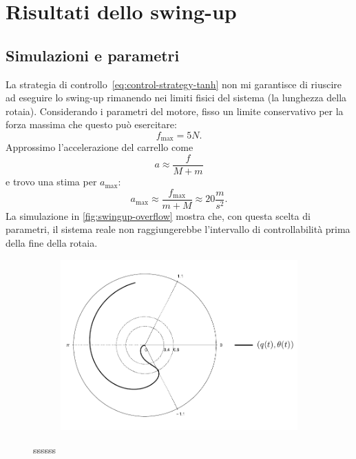 \section{Risultati dello swing-up}

\subsection{Simulazioni e parametri}
La strategia di controllo~\eqref{eq:control-strategy-tanh} non
mi garantisce di riuscire ad eseguire lo swing-up rimanendo nei
limiti fisici del sistema (la lunghezza della rotaia).
Considerando i parametri del motore, fisso un limite conservativo
per la forza massima che questo può esercitare:
\begin{equation*}
    f_{\max} = 5N.
\end{equation*}
Approssimo l'accelerazione del carrello come
\begin{equation*}
    a \approx \frac f {M + m}
\end{equation*}
e trovo una stima per $a_{\max}$:
\begin{equation*}
    a_{\max} \approx \frac {f_{\max}}{m+M} \approx 20 \frac m {s^2}.
\end{equation*}
La simulazione in \autoref{fig:swingup-overflow} mostra che,
con questa scelta di parametri, il sistema
reale non raggiungerebbe
l'intervallo di controllabilità prima della fine della rotaia.

\begin{figure}[h]
    \centering
    \begin{subfigure}[]{\textwidth}
        \centering
        \includegraphics[width=.8\textwidth]{assets/polar-swingup-simulation}
    \end{subfigure}

    \caption[sssss]{
        ssssss
    }
    \label{fig:swingup-overflow}
\end{figure}

